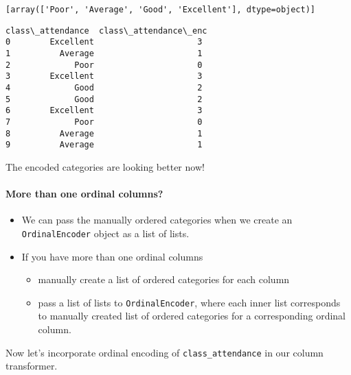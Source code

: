 \documentclass[11pt]{article}
\makeatletter
\providecommand{\tightlist}{%
      \setlength{\itemsep}{0pt}\setlength{\parskip}{0pt}}
\newcommand{\boxspacing}{\kern\kvtcb@left@rule\kern\kvtcb@boxsep}
\newcommand{\prompt}[4]{
        {\ttfamily\llap{{\color{#2}[#3]:\hspace{3pt}#4}}\vspace{-\baselineskip}}
    }
\makeatother
\begin{document}
    \begin{Verbatim}[commandchars=\\\{\}]
[array(['Poor', 'Average', 'Good', 'Excellent'], dtype=object)]
    \end{Verbatim}

            \begin{tcolorbox}[breakable, size=fbox, boxrule=.5pt, pad at break*=1mm, opacityfill=0]
\prompt{Out}{outcolor}{38}{\boxspacing}
\begin{Verbatim}[commandchars=\\\{\}]
  class\_attendance  class\_attendance\_enc
0        Excellent                     3
1          Average                     1
2             Poor                     0
3        Excellent                     3
4             Good                     2
5             Good                     2
6        Excellent                     3
7             Poor                     0
8          Average                     1
9          Average                     1
\end{Verbatim}
\end{tcolorbox}
        
    The encoded categories are looking better now!

    \paragraph{More than one ordinal
columns?}\label{more-than-one-ordinal-columns}

\begin{itemize}
\tightlist
\item
  We can pass the manually ordered categories when we create an
  \texttt{OrdinalEncoder} object as a list of lists.
\item
  If you have more than one ordinal columns

  \begin{itemize}
  \tightlist
  \item
    manually create a list of ordered categories for each column
  \item
    pass a list of lists to \texttt{OrdinalEncoder}, where each inner
    list corresponds to manually created list of ordered categories for
    a corresponding ordinal column.
  \end{itemize}
\end{itemize}

    Now let's incorporate ordinal encoding of \texttt{class\_attendance} in
our column transformer.
\end{document}
